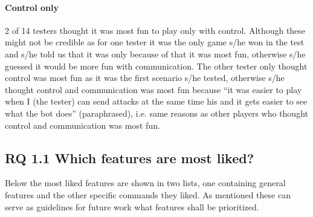 \paragraph{Control only}
2 of 14 testers thought it was most fun to play only with control. Although these might not be
credible as for one tester it was the only game s/he won in the test and s/he told us that it was
only because of that it was most fun, otherwise s/he guessed it would be more fun with
communication. The other tester only thought control was most fun as it was the first scenario s/he
tested, otherwise s/he thought control and communication was most fun because ``it was easier to play
when I (the tester) can send attacks at the same time his and it gets easier to see what the bot
does'' (paraphrased), i.e. same reasons as other players who thought control and communication was most fun.

\subsection{RQ 1.1 Which features are most liked?}
Below the most liked features are shown in two lists, one containing general features and the other
specific commands they liked. As mentioned these can serve as guidelines for future work what
features shall be prioritized.
